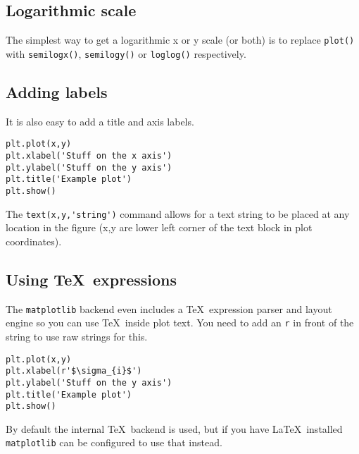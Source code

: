 \documentclass[10pt,a4paper]{article}
\begin{document}
\subsection{Logarithmic scale}
The simplest way to get a logarithmic x or y scale (or both) is to replace \verb|plot()| with \verb|semilogx()|, \verb|semilogy()| or \verb|loglog()| respectively.
\subsection{Adding labels}
It is also easy to add a title and axis labels.
\begin{lstlisting}
plt.plot(x,y)
plt.xlabel('Stuff on the x axis')
plt.ylabel('Stuff on the y axis')
plt.title('Example plot')
plt.show()
\end{lstlisting}
The \verb|text(x,y,'string')| command allows for a text string to be placed at any location in the figure (x,y are lower left corner of the text block in plot coordinates).

\subsection{Using \TeX\, expressions} The \verb|matplotlib| backend even includes a \TeX\, expression parser and layout engine so you can use \TeX\, inside plot text. You need to add an \verb|r| in front of the string to use raw strings for this.
\begin{lstlisting}
plt.plot(x,y)
plt.xlabel(r'$\sigma_{i}$')
plt.ylabel('Stuff on the y axis')
plt.title('Example plot')
plt.show()
\end{lstlisting}
By default the internal \TeX\, backend is used, but if you have \LaTeX\, installed \verb|matplotlib| can be configured to use that instead.
\end{document}

